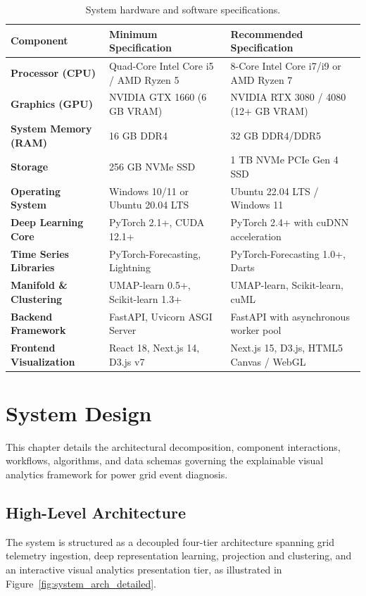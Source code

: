 \documentclass[12pt,a4paper]{report}
\begin{document}
\begin{table}[H]
\centering
\small
\caption{System hardware and software specifications.}
\label{tab:hardware_software_specs}
\begin{tabularx}{\linewidth}{p{3.4cm} X X}
\toprule
\textbf{Component} & \textbf{Minimum Specification} & \textbf{Recommended Specification} \\
\midrule
\textbf{Processor (CPU)} & Quad-Core Intel Core i5 / AMD Ryzen 5 & 8-Core Intel Core i7/i9 or AMD Ryzen 7 \\
\textbf{Graphics (GPU)} & NVIDIA GTX 1660 (6 GB VRAM) & NVIDIA RTX 3080 / 4080 (12+ GB VRAM) \\
\textbf{System Memory (RAM)} & 16 GB DDR4 & 32 GB DDR4/DDR5 \\
\textbf{Storage} & 256 GB NVMe SSD & 1 TB NVMe PCIe Gen 4 SSD \\
\textbf{Operating System} & Windows 10/11 or Ubuntu 20.04 LTS & Ubuntu 22.04 LTS / Windows 11 \\
\textbf{Deep Learning Core} & PyTorch 2.1+, CUDA 12.1+ & PyTorch 2.4+ with cuDNN acceleration \\
\textbf{Time Series Libraries} & PyTorch-Forecasting, Lightning & PyTorch-Forecasting 1.0+, Darts \\
\textbf{Manifold \& Clustering} & UMAP-learn 0.5+, Scikit-learn 1.3+ & UMAP-learn, Scikit-learn, cuML \\
\textbf{Backend Framework} & FastAPI, Uvicorn ASGI Server & FastAPI with asynchronous worker pool \\
\textbf{Frontend Visualization} & React 18, Next.js 14, D3.js v7 & Next.js 15, D3.js, HTML5 Canvas / WebGL \\
\bottomrule
\end{tabularx}
\end{table}


\chapter{System Design}

This chapter details the architectural decomposition, component interactions, workflows, algorithms, and data schemas governing the explainable visual analytics framework for power grid event diagnosis.

\section{High-Level Architecture}
The system is structured as a decoupled four-tier architecture spanning grid telemetry ingestion, deep representation learning, projection and clustering, and an interactive visual analytics presentation tier, as illustrated in Figure~\ref{fig:system_arch_detailed}.
\end{document}

